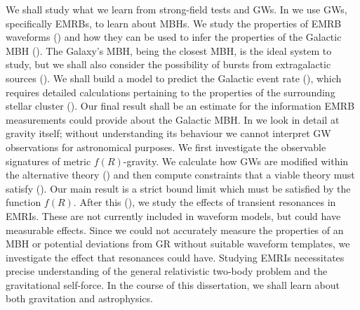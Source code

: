 We shall study what we learn from strong-field tests and GWs. In  we use GWs, specifically EMRBs, to learn about MBHs. We study the properties of EMRB waveforms () and how they can be used to infer the properties of the Galactic MBH (). The Galaxy's MBH, being the closest MBH, is the ideal system to study, but we shall also consider the possibility of bursts from extragalactic sources (). We shall build a model to predict the Galactic event rate (), which requires detailed calculations pertaining to the properties of the surrounding stellar cluster (). Our final result shall be an estimate for the information EMRB measurements could provide about the Galactic MBH. In  we look in detail at gravity itself; without understanding its behaviour we cannot interpret GW observations for astronomical purposes. We first investigate the observable signatures of metric $f(R)$-gravity. We calculate how GWs are modified within the alternative theory () and then compute constraints that a viable theory must satisfy (). Our main result is a strict bound limit which must be satisfied by the function $f(R)$. After this (), we study the effects of transient resonances in EMRIs. These are not currently included in waveform models, but could have measurable effects. Since we could not accurately measure the properties of an MBH or potential deviations from GR without suitable waveform templates, we investigate the effect that resonances could have. Studying EMRIs necessitates precise understanding of the general relativistic two-body problem and the gravitational self-force. In the course of this dissertation, we shall learn about both gravitation and astrophysics.

